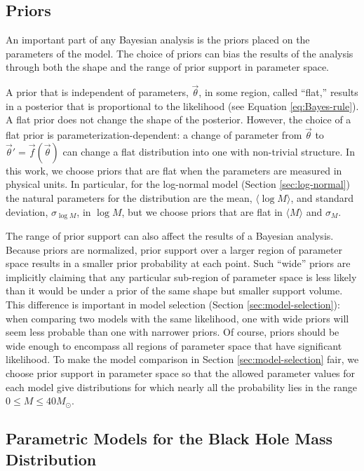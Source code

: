 \documentclass[preprint]{aastex}
\newcommand{\Msun}{M_\odot}
\newcommand{\vtheta}{\vec{\theta}}
\begin{document}
\subsection{Priors}
\label{sec:priors}

An important part of any Bayesian analysis is the priors placed on the
parameters of the model.  The choice of priors can bias the results of
the analysis through both the shape and the range of prior support in
parameter space.

A prior that is independent of parameters, $\vtheta$, in some region,
called ``flat,'' results in a posterior that is proportional to the
likelihood (see Equation \eqref{eq:Bayes-rule}).  A flat prior does
not change the shape of the posterior.  However, the choice of a flat
prior is parameterization-dependent: a change of parameter from
$\vtheta$ to $\vtheta' = \vec{f}(\vtheta)$ can change a flat
distribution into one with non-trivial structure.  In this work, we
choose priors that are flat when the parameters are measured in
physical units.  In particular, for the log-normal model (Section
\ref{sec:log-normal}) the natural parameters for the distribution are
the mean, $\langle \log M \rangle$, and standard deviation,
$\sigma_{\log M}$, in $\log M$, but we choose priors that are flat in
$\langle M \rangle$ and $\sigma_M$.

The range of prior support can also affect the results of a Bayesian
analysis.  Because priors are normalized, prior support over a larger
region of parameter space results in a smaller prior probability at
each point.  Such ``wide'' priors are implicitly claiming that any
particular sub-region of parameter space is less likely than it would
be under a prior of the same shape but smaller support volume.  This
difference is important in model selection (Section
\ref{sec:model-selection}): when comparing two models with the same
likelihood, one with wide priors will seem less probable than one with
narrower priors.  Of course, priors should be wide enough to encompass
all regions of parameter space that have significant likelihood.  To
make the model comparison in Section \ref{sec:model-selection} fair,
we choose prior support in parameter space so that the allowed
parameter values for each model give distributions for which nearly
all the probability lies in the range $0 \leq M \leq 40 \Msun$.

\subsection{Parametric Models for the Black Hole Mass Distribution}
\label{sec:parametric-models}
\end{document}

